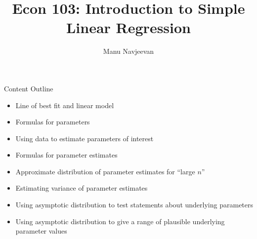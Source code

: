 \documentclass[notheorems, 9pt]{beamer}
\title{Econ 103: Introduction to Simple Linear Regression}
\author{Manu Navjeevan}
\institute{UCLA}
\begin{document}
\frame{\titlepage}
\begin{frame}{Content Outline} 
	\label{frame:content-outline}
	\begin{itemize}
		\item Line of best fit and linear model
		\item Formulas for parameters 
	\end{itemize}
	\begin{itemize}
		\item Using data to estimate parameters of interest
		\item Formulas for parameter estimates
	\end{itemize}
	\begin{itemize}
		\item Approximate distribution of parameter estimates for ``large \(n\)''
		\item Estimating variance of parameter estimates
	\end{itemize}
	\begin{itemize}
		\item Using asymptotic distribution to test statements about underlying parameters
		\item Using asymptotic distribution to give a range of plausible underlying parameter values 
	\end{itemize}
\end{frame}
\end{document}
